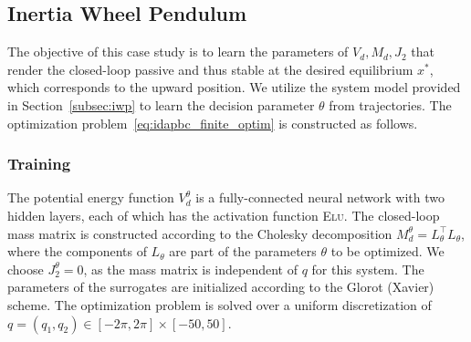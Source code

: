 \subsection{Inertia Wheel Pendulum}

The objective of this case study is to learn the parameters of $V_d, M_d, J_2$
that render the closed-loop passive and thus stable at the desired equilibrium
$x^*$, which corresponds to the upward position.
%
We utilize the system model provided in Section~\ref{subsec:iwp} to learn the decision
parameter $\theta$ from trajectories.
%
The optimization problem~\eqref{eq:idapbc_finite_optim} is constructed as
follows. 

\subsubsection{Training}

The potential energy function $V_d^\theta$ is a fully-connected neural
network with two hidden layers, each of which has the activation function
\textsc{Elu}.
%
The closed-loop mass matrix is constructed according to the Cholesky
decomposition $M_d^\theta = L^\top_\theta L_\theta$, where the components of
$L_\theta$ are part of the parameters $\theta$ to be optimized.
%
We choose $J_2^\theta = 0$, as the mass matrix is independent of $q$ for
this system.
%
The parameters of the surrogates are initialized according to the Glorot
(Xavier)~\cite{glorot2010understanding} scheme.
%
The optimization problem is solved over a uniform discretization of $q = \left(
q_1, q_2 \right) \in [-2\pi, 2\pi] \times [-50, 50]$.


